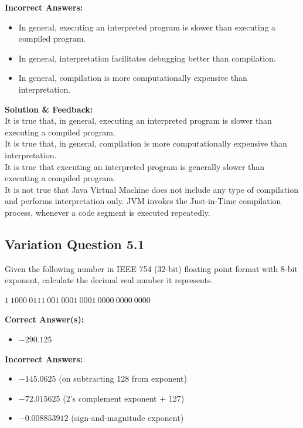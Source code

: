 \textbf{Incorrect Answers:}
\begin{itemize}
    \item In general, executing an interpreted program is slower than executing a compiled program.
    \item In general, interpretation facilitates debugging better than compilation.
    \item In general, compilation is more computationally expensive than interpretation.
\end{itemize}

\textbf{Solution \& Feedback:}\\
It is true that, in general, executing an interpreted program is slower than executing a compiled program.\\
It is true that, in general, compilation is more computationally expensive than interpretation.\\
It is true that executing an interpreted program is generally slower than executing a compiled program.\\
It is not true that Java Virtual Machine does not include any type of compilation and performs interpretation only. JVM invokes the Just-in-Time compilation process, whenever a code segment is executed repeatedly.

\subsection{Variation Question 5.1}

Given the following number in IEEE 754 (32-bit) floating point format with 8-bit exponent, calculate the decimal real number it represents.

$1\ 1000\ 0111\ 001\ 0001\ 0001\ 0000\ 0000\ 0000$

\textbf{Correct Answer(s):}
\begin{itemize}
    \item $-290.125$
\end{itemize}

\textbf{Incorrect Answers:}
\begin{itemize}
    \item $-145.0625$ (on subtracting 128 from exponent)
    \item $-72.015625$ (2’s complement exponent + 127)
    \item $-0.008853912$ (sign-and-magnitude exponent)
\end{itemize}


